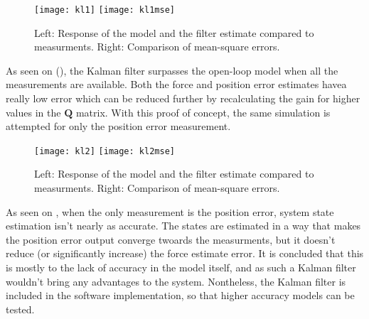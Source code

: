 \begin{figure}[H]
\centering
\hspace{-2.5em}\texttt{[image: kl1]}
\hspace{-2.5em}\texttt{[image: kl1mse]}
\caption{Left: Response of the model and the filter estimate compared to measurments. Right: Comparison of mean-square errors.}
\label{fig:kl1}
\end{figure}

As seen on (), the Kalman filter surpasses the open-loop model when all the measurements are available.
Both the force and position error estimates havea really low error which can be reduced further by recalculating the gain for higher values in the $\mathbf{Q}$ matrix.
With this proof of concept, the same simulation is attempted for only the position error measurement.

\begin{figure}[H]
\centering
\hspace{-2.5em}\texttt{[image: kl2]}
\hspace{-2.5em}\texttt{[image: kl2mse]}
\caption{Left: Response of the model and the filter estimate compared to measurments. Right: Comparison of mean-square errors.}
\label{fig:kl2}
\end{figure}

As seen on , when the only measurement is the position error, system state estimation isn't nearly as accurate.
The states are estimated in a way that makes the position error output converge twoards the measurments, but it doesn't reduce (or significantly increase) the force estimate error.
It is concluded that this is mostly to the lack of accuracy in the model itself, and as such a Kalman filter wouldn't bring any advantages to the system.
Nontheless, the Kalman filter is included in the software implementation, so that higher accuracy models can be tested.

%		
